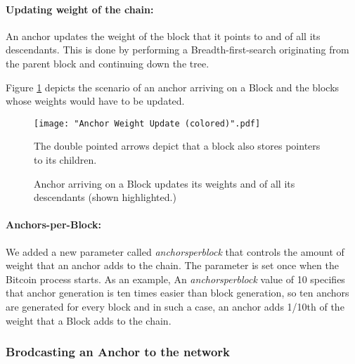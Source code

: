 \newpage
\paragraph{Updating weight of the chain:} 


An anchor updates the weight of the block that it points to and of all its descendants.
This is done by performing a Breadth-first-search originating from the parent block and continuing down the tree.

Figure \ref{fig-impl-anchor-weight-update} depicts the scenario of an anchor arriving on a Block and the blocks whose weights would have to be updated.

\setlength{\emergencystretch}{10pt}

\begin{figure}[!htb]
    \centering
    \texttt{[image: "Anchor Weight Update (colored)".pdf]}
    \caption[Weight update due to an Anchor]
    {Anchor arriving on a Block updates its weights and of all its descendants (shown highlighted.)}
    
    \medskip
    \footnotesize
    The double pointed arrows depict that a block also stores pointers to its children. 
    \label{fig-impl-anchor-weight-update}
\end{figure}

\paragraph{Anchors-per-Block:}
We added a new parameter called \textit{anchorsperblock} that controls the amount of weight that an anchor adds to the chain. The parameter is set once when the Bitcoin process starts. 
As an example, An \textit{anchorsperblock} value of 10 specifies that 
anchor generation is ten times easier than block generation, so ten anchors are generated for every block and in such a case, an anchor adds 1/10th of the weight that a Block adds to the chain.


\subsubsection{Brodcasting an Anchor to the network}

